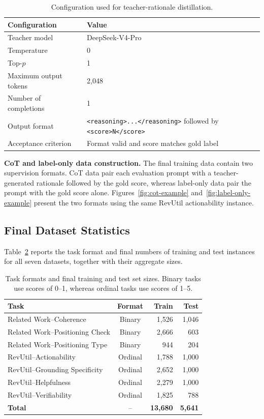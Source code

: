 \begin{table}[H]
\centering
\small
\begin{tabular}{lp{}}
\hline
\textbf{Configuration} & \textbf{Value} \\
\hline
Teacher model & DeepSeek-V4-Pro \\
Temperature & 0 \\
Top-$p$ & 1 \\
Maximum output tokens & 2,048 \\
Number of completions & 1 \\
Output format & \texttt{<reasoning>...</reasoning>} followed by
\texttt{<score>N</score>} \\
Acceptance criterion & Format valid and score matches gold label \\
\hline
\end{tabular}
\caption{Configuration used for teacher-rationale distillation.}
\label{tab:distillation-configuration}
\end{table}

\noindent\textbf{CoT and label-only data construction.}
The final training data contain two supervision formats. CoT data pair each
evaluation prompt with a teacher-generated rationale followed by the gold
score, whereas label-only data pair the prompt with the gold score alone.
Figures~\ref{fig:cot-example} and~\ref{fig:label-only-example} present the two
formats using the same RevUtil actionability instance.

\subsection{Final Dataset Statistics}

Table~\ref{tab:dataset-process-statistics} reports the task format and final
numbers of training and test instances for all seven datasets, together with
their aggregate sizes.

\begin{table}[H]
\centering
\small
\begin{tabular}{p{}crr}
\hline
\textbf{Task} & \textbf{Format} & \textbf{Train} & \textbf{Test} \\
\hline
Related Work--Coherence & Binary & 1,526 & 1,046 \\
Related Work--Positioning Check & Binary & 2,666 & 603 \\
Related Work--Positioning Type & Binary & 944 & 204 \\
RevUtil--Actionability & Ordinal & 1,788 & 1,000 \\
RevUtil--Grounding Specificity & Ordinal & 2,652 & 1,000 \\
RevUtil--Helpfulness & Ordinal & 2,279 & 1,000 \\
RevUtil--Verifiability & Ordinal & 1,825 & 788 \\
\hline
\textbf{Total} & -- & \textbf{13,680} & \textbf{5,641} \\
\hline
\end{tabular}
\caption{Task formats and final training and test set sizes. Binary tasks use
scores of 0--1, whereas ordinal tasks use scores of 1--5.}
\label{tab:dataset-process-statistics}
\end{table}
